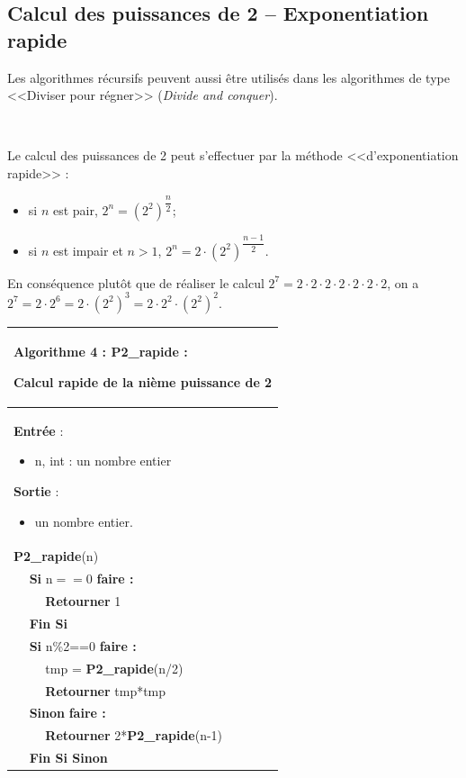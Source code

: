 \documentclass[10pt,fleqn]{article} %
\newcommand{\bfsf}[1]{\small\textbf{\textsf{#1}}}%
\newcommand{\tsf}[1]{\small{\textsf{#1}}}
\begin{document}
\subsection{Calcul des puissances de 2 -- Exponentiation rapide}

Les algorithmes récursifs peuvent aussi être utilisés dans les algorithmes de type <<Diviser pour régner>> (\textit{Divide and conquer}).

\begin{exemple}
$\;$ \\

\begin{minipage}[c]{.45\linewidth}
Le calcul des puissances de 2 peut s'effectuer par la méthode <<d'exponentiation rapide>> :
\begin{itemize}
\item si $n$ est pair, $2^n = \left(2^2\right)^{\dfrac{n}{2}}$;
\item si $n$ est impair et $n>1$, $2^n =2\cdot  \left(2^2\right)^{\dfrac{n-1}{2}}$.
\end{itemize}

En conséquence plutôt que de réaliser le calcul $ 2^7 = 2\cdot 2\cdot 2\cdot 2\cdot 2\cdot 2\cdot 2$, on a $ 2^7 = 2\cdot 2^6 =  2\cdot \left(2^2\right)^3=  2\cdot 2^2 \cdot \left(2^2\right)^2$. 
\end{minipage}\hfill
\begin{minipage}[c]{.45\linewidth}
\begin{tabular}{p{.5cm}p{.5cm}p{5cm}}
\hline
\multicolumn{3}{p{6cm}}{ \textbf{Algorithme 4 : P2\_rapide} : 

Calcul rapide de la nième puissance de 2} \\
\hline
\multicolumn{3}{p{6cm}}{
\textbf{Entrée} : 
\begin{itemize}
\item n, int  : un nombre entier
\end{itemize}
\textbf{Sortie} : 
\begin{itemize}
\item un nombre entier.
\end{itemize}}\\
\multicolumn{3}{p{6cm}}{\bfsf{P2\_rapide}\tsf{(n)}} \\
& \multicolumn{2}{l}{\bfsf{Si} \tsf{n$==$0} \bfsf{faire :}}\\
& & \bfsf{Retourner} 1\\
& \multicolumn{2}{l}{\bfsf{Fin Si}}\\
& \multicolumn{2}{l}{\bfsf{Si} \tsf{n\%2==0} \bfsf{faire :}}\\
&& \tsf{tmp} = \bfsf{P2\_rapide}\tsf{(n/2)}\\
&& \bfsf{Retourner} tmp*tmp\\
& \multicolumn{2}{l}{\bfsf{Sinon} \bfsf{faire :}}\\
&& \bfsf{Retourner} \tsf{2*}\bfsf{P2\_rapide}\tsf{(n-1)}\\
& \multicolumn{2}{l}{\bfsf{Fin Si Sinon}}\\
\hline
\end{tabular}
\end{minipage}
\end{exemple}
\end{document}
